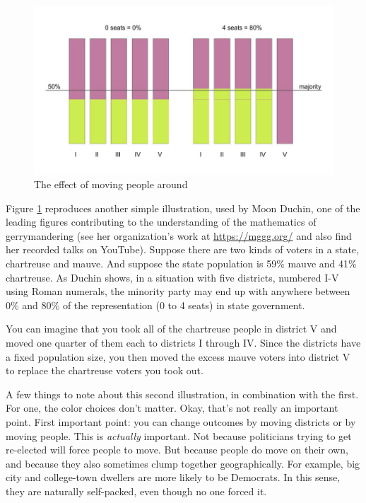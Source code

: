 \documentclass[
  openany]{book}
\begin{document}
\begin{figure}

{\centering \includegraphics[width=0.9\linewidth]{images/gerrymandering2} 

}

\caption{The effect of moving people around}\label{fig:gerrymandering-simple2}
\end{figure}

Figure \ref{fig:gerrymandering-simple2} reproduces another simple illustration, used by Moon Duchin, one of the leading figures contributing to the understanding of the mathematics of gerrymandering (see her organization's work at \url{https://mggg.org/} and also find her recorded talks on YouTube). Suppose there are two kinds of voters in a state, chartreuse and mauve. And suppose the state population is 59\% mauve and 41\% chartreuse. As Duchin shows, in a situation with five districts, numbered I-V using Roman numerals, the minority party may end up with anywhere between 0\% and 80\% of the representation (0 to 4 seats) in state government.

You can imagine that you took all of the chartreuse people in district V and moved one quarter of them each to districts I through IV. Since the districts have a fixed population size, you then moved the excess mauve voters into district V to replace the chartreuse voters you took out.

A few things to note about this second illustration, in combination with the first. For one, the color choices don't matter. Okay, that's not really an important point. First important point: you can change outcomes by moving districts or by moving people. This is \emph{actually} important. Not because politicians trying to get re-elected will force people to move. But because people do move on their own, and because they also sometimes clump together geographically. For example, big city and college-town dwellers are more likely to be Democrats. In this sense, they are naturally self-packed, even though no one forced it.
\end{document}
